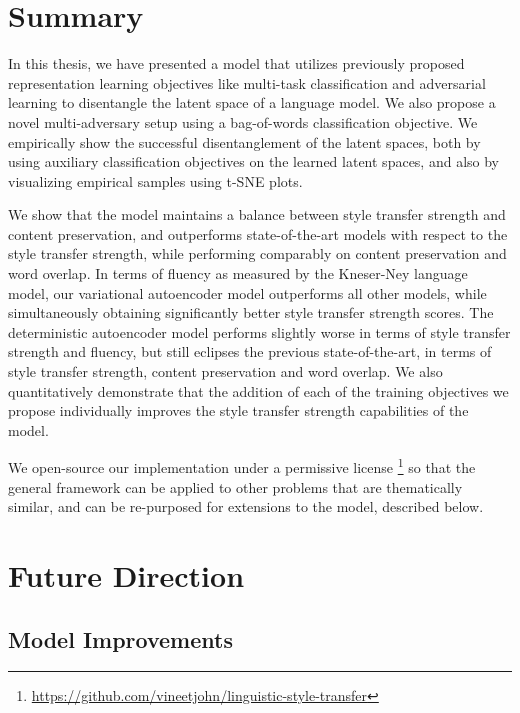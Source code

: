 \section{Summary}

In this thesis, we have presented a model that utilizes previously proposed representation learning objectives like multi-task classification and adversarial learning to disentangle the latent space of a language model. We also propose a novel multi-adversary setup using a bag-of-words classification objective. We empirically show the successful disentanglement of the latent spaces, both by using auxiliary classification objectives on the learned latent spaces, and also by visualizing empirical samples using t-SNE plots.

We show that the model maintains a balance between style transfer strength and content preservation, and outperforms state-of-the-art models with respect to the style transfer strength, while performing comparably on content preservation and word overlap. In terms of fluency as measured by the Kneser-Ney language model, our variational autoencoder model outperforms all other models, while simultaneously obtaining significantly better style transfer strength scores. The deterministic autoencoder model performs slightly worse in terms of style transfer strength and fluency, but still eclipses the previous state-of-the-art, in terms of style transfer strength, content preservation and word overlap. We also quantitatively demonstrate that the addition of each of the training objectives we propose individually improves the style transfer strength capabilities of the model.

We open-source our implementation under a permissive license \footnote{\url{https://github.com/vineetjohn/linguistic-style-transfer}} so that the general framework can be applied to other problems that are thematically similar, and can be re-purposed for extensions to the model, described below.


\section{Future Direction}

\subsection{Model Improvements}

